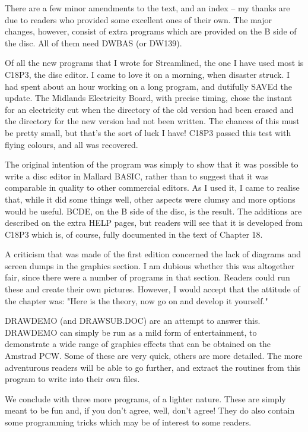 There  are a few minor amendments to the text, and an index -- my  thanks  are 
due  to  readers  who provided some excellent ones of  their  own.  The  major 
changes,  however, consist of extra programs which are provided on the B  side 
of the disc. All of them need DWBAS (or DW139).

Of all the new programs that I wrote for Streamlined, the one I have used most 
is  C18P3,  the  disc editor. I came to love it on a  morning,  when  disaster 
struck.  I  had spent about an hour working on a long program,  and  dutifully 
SAVEd  the update. The Midlands Electricity Board, with precise timing,  chose 
the  instant for an electricity cut when the directory of the old version  had 
been  erased and the directory for the new version had not been  written.  The 
chances  of  this must be pretty small, but that's the sort of  luck  I  have! 
C18P3 passed this test with flying colours, and all was recovered.

The original intention of the program was simply to show that it was  possible 
to  write a disc editor in Mallard BASIC, rather than to suggest that  it  was 
comparable  in  quality to other commercial editors. As I used it, I  came  to 
realise  that,  while it did some things well, other aspects were  clumsy  and 
more options would be useful. BCDE, on the B side of the disc, is the  result. 
The additions are described on the extra HELP pages, but readers will see that 
it  is developed from C18P3 which is, of course, fully documented in the  text 
of Chapter 18.

A criticism that was made of the first edition concerned the lack of  diagrams 
and  screen  dumps  in the graphics section. I am  dubious  whether  this  was 
altogether  fair,  since  there were a number of  programs  in  that  section. 
Readers could run these and create their own pictures. However, I would accept 
that  the  attitude  of the chapter was: "Here is the theory, now  go  on  and 
develop it yourself."

DRAWDEMO (and DRAWSUB.DOC) are an attempt to answer this. DRAWDEMO can  simply 
be  run  as  a  mild form of entertainment, to demonstrate  a  wide  range  of 
graphics  effects that can be obtained on the Amstrad PCW. Some of  these  are 
very  quick,  others are more detailed. The more adventurous readers  will  be 
able  to go further, and extract the routines from this program to write  into 
their own files.

We  conclude with three more programs, of a lighter nature. These  are  simply 
meant  to  be  fun and, if you don't agree, well, don't agree!  They  do  also 
contain some programming tricks which may be of interest to some readers.

